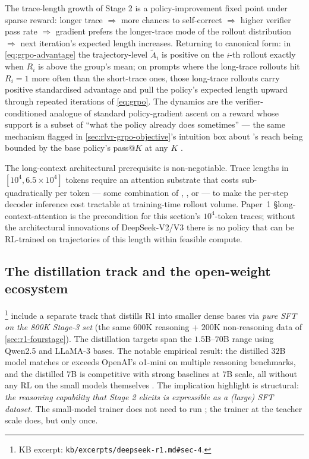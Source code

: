 \begin{analogy}
The trace-length growth of Stage 2 is a policy-improvement fixed
point under sparse reward: longer trace $\Rightarrow$ more chances to
self-correct $\Rightarrow$ higher verifier pass rate $\Rightarrow$
 gradient prefers the longer-trace mode of the rollout
distribution $\Rightarrow$ next iteration's expected length increases.
Returning to canonical form: in
\cref{eq:grpo-advantage} the trajectory-level $\tilde{A}_i$ is
positive on the $i$-th rollout exactly when $R_i$ is above the
group's mean; on prompts where the long-trace rollouts hit
$R_i = 1$ more often than the short-trace ones, those long-trace
rollouts carry positive standardised advantage and pull the policy's
expected length upward through repeated iterations of \cref{eq:grpo}.
The dynamics are the verifier-conditioned analogue of standard
policy-gradient ascent on a reward whose support is a subset of
``what the policy already does sometimes'' --- the same mechanism
flagged in \cref{sec:rlvr-grpo-objective}'s intuition box about
's reach being bounded by the base policy's pass@$K$ at any $K$
\citep{rlvr-limits-2025}.
\end{analogy}

The long-context architectural prerequisite is non-negotiable. Trace
lengths in $[10^4, 6.5\!\times\!10^4]$ tokens
\citep[\S 2.1]{deepseek-r1} require an attention substrate that
costs sub-quadratically per token --- some combination of , ,
or  --- to make the per-step decoder
inference cost tractable at training-time rollout volume. Paper~1
§long-context-attention is the precondition for this section's
$10^4$-token traces; without the architectural innovations of
DeepSeek-V2/V3 there is no policy that can be RL-trained on
trajectories of this length within feasible compute.

\subsection{The distillation track and the open-weight ecosystem}
\label{sec:r1-distillation}

\citet[\S 4]{deepseek-r1}\footnote{KB excerpt:
\texttt{kb/excerpts/deepseek-r1.md\#sec-4}.} include a separate track
that distills R1 into smaller dense bases via \emph{pure SFT on the
800K Stage-3 set} (the same $600$K reasoning + $200$K non-reasoning
data of \cref{sec:r1-fourstage}). The distillation targets span the
$1.5$B--$70$B range using Qwen2.5 and LLaMA-3 bases. The notable
empirical result: the distilled $32$B model matches or exceeds
OpenAI's o1-mini on multiple reasoning benchmarks, and the distilled
$7$B is competitive with strong baselines at $7$B scale, all without
any RL on the small models themselves \citep[\S 4]{deepseek-r1}. The
implication \citet{deepseek-r1} highlight is structural: \emph{the
reasoning capability that Stage 2 elicits is expressible as a (large)
SFT dataset}. The small-model trainer does not need to run ; the
trainer at the teacher scale does, but only once.

